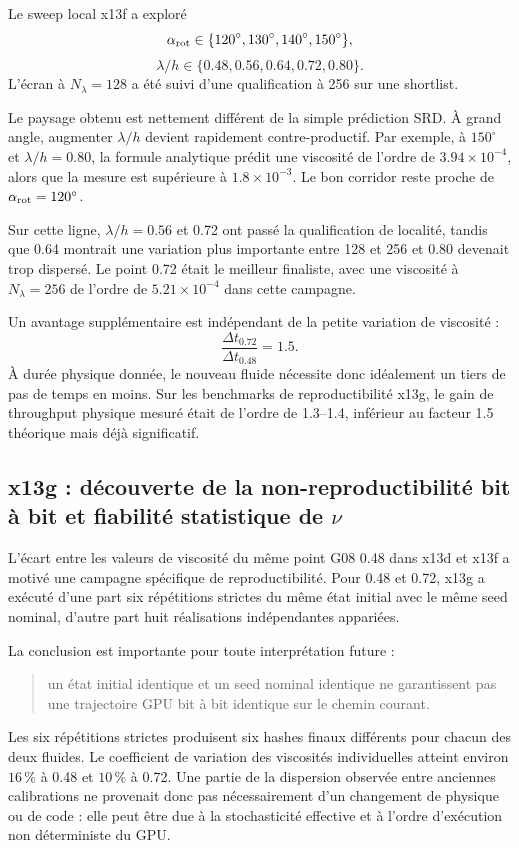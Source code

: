 \documentclass[11pt,a4paper]{article}
\begin{document}
Le sweep local x13f a exploré
\begin{equation}
  \alpha_{\rm rot}
  \in
  \{120^\circ,130^\circ,140^\circ,150^\circ\},
\end{equation}
\begin{equation}
  \lambda/h
  \in
  \{0.48,0.56,0.64,0.72,0.80\}.
\end{equation}
L'écran à $N_\lambda=128$ a été suivi d'une qualification à 256 sur une shortlist.

Le paysage obtenu est nettement différent de la simple prédiction SRD. À grand angle, augmenter $\lambda/h$ devient rapidement contre-productif. Par exemple, à $150^\circ$ et $\lambda/h=0.80$, la formule analytique prédit une viscosité de l'ordre de $3.94\times10^{-4}$, alors que la mesure est supérieure à $1.8\times10^{-3}$. Le bon corridor reste proche de $\alpha_{\rm rot}=120^\circ$.

Sur cette ligne, $\lambda/h=0.56$ et 0.72 ont passé la qualification de localité, tandis que 0.64 montrait une variation plus importante entre 128 et 256 et 0.80 devenait trop dispersé. Le point 0.72 était le meilleur finaliste, avec une viscosité à $N_\lambda=256$ de l'ordre de $5.21\times10^{-4}$ dans cette campagne.

Un avantage supplémentaire est indépendant de la petite variation de viscosité :
\begin{equation}
  \frac{\Delta t_{0.72}}{\Delta t_{0.48}}=1.5.
  \label{eq:x13-dt-gain}
\end{equation}
À durée physique donnée, le nouveau fluide nécessite donc idéalement un tiers de pas de temps en moins. Sur les benchmarks de reproductibilité x13g, le gain de throughput physique mesuré était de l'ordre de 1.3--1.4, inférieur au facteur 1.5 théorique mais déjà significatif.

\subsection{x13g : découverte de la non-reproductibilité bit à bit et fiabilité statistique de \texorpdfstring{$\nu$}{nu}}

L'écart entre les valeurs de viscosité du même point G08 0.48 dans x13d et x13f a motivé une campagne spécifique de reproductibilité. Pour 0.48 et 0.72, x13g a exécuté d'une part six répétitions strictes du même état initial avec le même seed nominal, d'autre part huit réalisations indépendantes appariées.

La conclusion est importante pour toute interprétation future :
\begin{quote}
un état initial identique et un seed nominal identique ne garantissent pas une trajectoire GPU bit à bit identique sur le chemin courant.
\end{quote}
Les six répétitions strictes produisent six hashes finaux différents pour chacun des deux fluides. Le coefficient de variation des viscosités individuelles atteint environ $16\,\%$ à 0.48 et $10\,\%$ à 0.72. Une partie de la dispersion observée entre anciennes calibrations ne provenait donc pas nécessairement d'un changement de physique ou de code : elle peut être due à la stochasticité effective et à l'ordre d'exécution non déterministe du GPU.
\end{document}
